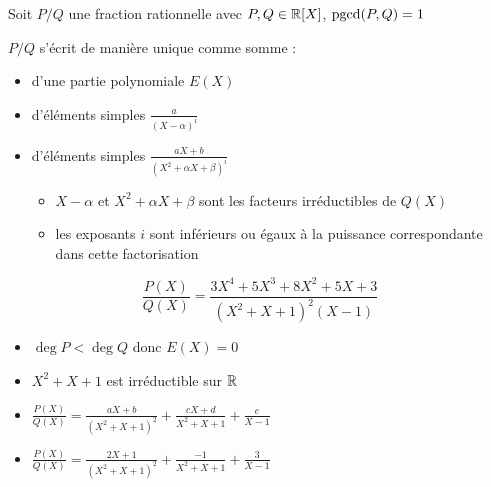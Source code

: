 \begin{frame}

Soit $P/Q$ une fraction rationnelle avec $P,Q \in \mathbb{R}[X]$, $\mathop{\text{pgcd}}\nolimits(P,Q)=1$
\begin{theoreme}
$P/Q$ s'écrit de manière unique comme somme :
\begin{itemize}
  \item d'une partie polynomiale $E(X)$
  \item d'éléments simples $\frac{a}{(X-\alpha)^i}$
  \item d'éléments simples $\frac{aX+b}{(X^2+\alpha X + \beta)^i}$

  \pause
  
  \begin{itemize}
    \item $X-\alpha$ et $X^2 + \alpha X + \beta$ sont les facteurs irréductibles de $Q(X)$
    
    \pause
    
    \item les exposants $i$ sont inférieurs ou égaux à la puissance correspondante dans cette factorisation
  \end{itemize}
\end{itemize}

\end{theoreme}
\end{frame}



\begin{frame}

\begin{exemple} 
$$\frac{P(X)}{Q(X)}=\frac{3X^4+5X^3+8X^2+5X+3}{(X^2+X+1)^2(X-1)}$$

\pause

\begin{itemize}[<+->]
\setlength{\itemsep}{7pt} 
  \item $\deg P < \deg Q$ donc $E(X)=0$
  \item $X^2+X+1$ est irréductible sur $\mathbb{R}$
  \item $\displaystyle \frac{P(X)}{Q(X)} = \frac{aX+b}{(X^2+X+1)^2}+\frac{cX+d}{X^2+X+1}+\frac{e}{X-1}$
  \item $\displaystyle \frac{P(X)}{Q(X)} = \frac{2X+1}{(X^2+X+1)^2}+\frac{-1}{X^2+X+1}+\frac{3}{X-1}$
\end{itemize}
\end{exemple}

\end{frame}



